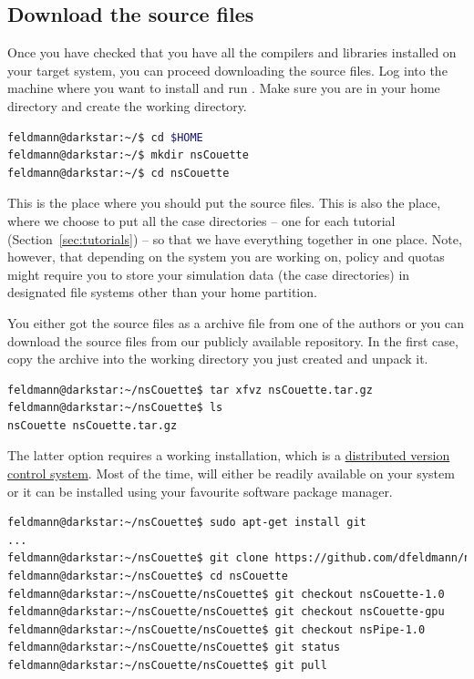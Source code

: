 \documentclass[a4paper, 11pt, DIV=11]{scrartcl}
\begin{document}
\subsection{Download the source files}
\label{sec:download}

Once you have checked that you have all the compilers and libraries installed
on your target system, you can proceed downloading the \nsc source files. Log
into the machine where you want to install and run \nsc. Make sure you are in
your home directory and create the \nsc working directory.
\begin{lstlisting}[language=bash]
feldmann@darkstar:~/$ cd $HOME
feldmann@darkstar:~/$ mkdir nsCouette
feldmann@darkstar:~/$ cd nsCouette
\end{lstlisting}
This is the place where you should put the source files. This is also the place, 
where we choose to put all the case directories -- one for each tutorial
(Section~\ref{sec:tutorials}) -- so that we have everything together in one place. Note,
however, that depending on the system you are working on, policy and quotas might
require you to store your simulation data (\ie the case directories) in
designated file systems other than your home partition.
\par
You either got the source files as a  archive file from one of the
authors or you can download the source files from our publicly available
\href{https://github.com/dfeldmann/nsCoutte}{} repository.
In the first case, copy the archive into the working directory you just created
and unpack it.
\begin{lstlisting}[language=bash]
feldmann@darkstar:~/nsCouette$ tar xfvz nsCouette.tar.gz
feldmann@darkstar:~/nsCouette$ ls
nsCouette nsCouette.tar.gz
\end{lstlisting}
The latter option requires a working  installation, which is a
\href{https://git-scm.com/}{distributed version control system}. Most of
the time,  will either be readily available on your system or
it can be installed using your favourite software package manager.
\begin{lstlisting}[language=bash]
feldmann@darkstar:~/nsCouette$ sudo apt-get install git
...
feldmann@darkstar:~/nsCouette$ git clone https://github.com/dfeldmann/nsCouette
feldmann@darkstar:~/nsCouette$ cd nsCouette
feldmann@darkstar:~/nsCouette/nsCouette$ git checkout nsCouette-1.0
feldmann@darkstar:~/nsCouette/nsCouette$ git checkout nsCouette-gpu
feldmann@darkstar:~/nsCouette/nsCouette$ git checkout nsPipe-1.0
feldmann@darkstar:~/nsCouette/nsCouette$ git status
feldmann@darkstar:~/nsCouette/nsCouette$ git pull
\end{lstlisting}
\end{document}
